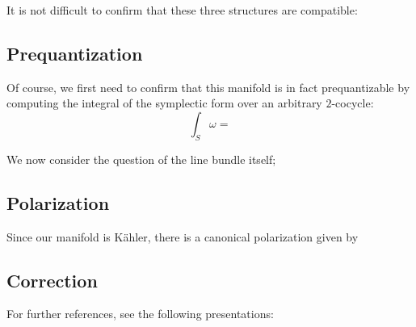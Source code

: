 It is not difficult to confirm that these three structures are compatible: %

\subsection{Prequantization}

Of course, we first need to confirm that this manifold is in fact prequantizable by computing the integral of the symplectic form over an arbitrary $2$-cocycle:
$$
\int_S \omega = %
$$

We now consider the question of the line bundle itself; %

\subsection{Polarization}

Since our manifold is K\"{a}hler, there is a canonical polarization given by%

\subsection{Correction}







For further references, see the following presentations:

